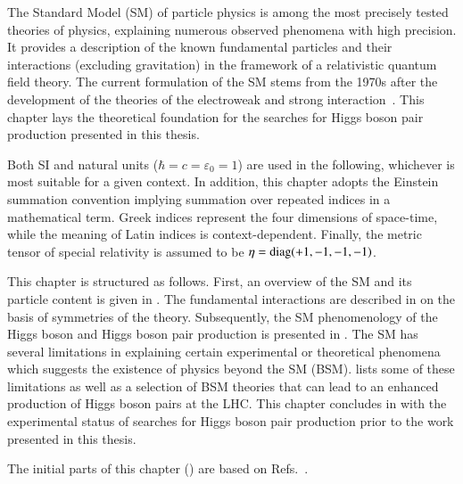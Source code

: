 The Standard Model (SM) of particle physics is among the most precisely tested
theories of physics, explaining numerous observed phenomena with high
precision. It provides a description of the known fundamental particles and
their interactions (excluding gravitation) in the framework of a relativistic
quantum field theory. The current formulation of the SM stems from the 1970s
after the development of the theories of the electroweak and strong
interaction~\cite{Glashow:1961tr,Salam:1964ry,Weinberg:1967tq,Englert:1964et,Higgs:1964pj,tHooft:1971qjg,Fritzsch:1973pi,Gross:1973id,Politzer:1973fx}.
This chapter lays the theoretical foundation for the searches for Higgs boson
pair production presented in this thesis.

Both SI and natural units ($\hbar = c = \varepsilon_0 = 1$) are used in the
following, whichever is most suitable for a given context. In addition, this
chapter adopts the Einstein summation convention implying summation over
repeated indices in a mathematical term. Greek indices represent the four
dimensions of space-time, while the meaning of Latin indices is
context-dependent. Finally, the metric tensor of special relativity is assumed
to be $\eta = \operatorname{diag}(+1, -1, -1, -1)$.

This chapter is structured as follows. First, an overview of the SM and its
particle content is given in . The fundamental
interactions are described in  on the
basis of symmetries of the theory. Subsequently, the SM phenomenology of the
Higgs boson and Higgs boson pair production is presented in
. The SM has several limitations in explaining certain
experimental or theoretical phenomena which suggests the existence of physics
beyond the SM (BSM).  lists some of these limitations as well as a
selection of BSM theories that can lead to an enhanced production of Higgs boson
pairs at the LHC. This chapter concludes in  with
the experimental status of searches for Higgs boson pair production prior to the
work presented in this thesis.

The initial parts of this chapter
() are based on
Refs.~\cite{Halzen:1984mc,Thomson:2013zua,Djouadi:2005gi}.


